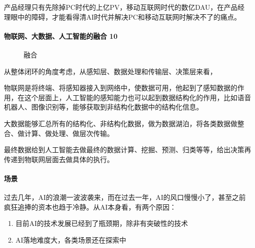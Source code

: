 \documentclass[letterpaper,10pt,english]{sphinxmanual}
\begin{document}
产品经理只有先除掉PC时代的上亿PV，移动互联网时代的数亿DAU，在产品经理眼中的障碍，才能看得清AI时代并解决PC和移动互联网时解决不了的痛点。


\paragraph{物联网、大数据、人工智能的融合 10\sphinxfootnotemark[235]}
\label{\detokenize{chapter_introduction/AI:id26}}%
\begin{footnotetext}[235]\sphinxAtStartFootnote
{}
%
\end{footnotetext}\ignorespaces 
\begin{figure}[H]
\centering
\capstart

\noindent{}
\caption{融合\sphinxfootnotemark[236]}\label{\detokenize{chapter_introduction/AI:id40}}\end{figure}
%
\begin{footnotetext}[236]\sphinxAtStartFootnote
{}
%
\end{footnotetext}\ignorespaces 
从整体闭环的角度考虑，从感知层、数据处理和传输层、决策层来看，

物联网是将终端、将感知器接入到网络中，使数据可用，他起到了感知数据的作用，在这个层面上，人工智能的感知能力也可以起到数据结构化的作用，比如语音机器人、图像识别等，能够获取到非结构化数据中的结构化信息。

大数据能够汇总所有的结构化、非结构化数据，做为数据湖泊，将各类数据做整合、做计算、做处理、做层次传输。

最终数据给到人工智能去做最终的数据计算、挖掘、预测、归类等等，给出决策再传递到物联网层面去做具体的执行。


\paragraph{场景}
\label{\detokenize{chapter_introduction/AI:id27}}
过去几年，AI的浪潮一波波袭来，而在过去一年，AI的风口慢慢小了，甚至之前疯狂追捧的资本也趋于冷静。从AI本身看，有两个原因：
%
\begin{footnote}[237]\sphinxAtStartFootnote
{}
%
\end{footnote}
\begin{enumerate}
%
\item {} 
目前AI的技术发展已经到了瓶颈期，除非有突破性的技术

\item {} 
AI落地难度大，各类场景还在探索中

\end{enumerate}
\end{document}
